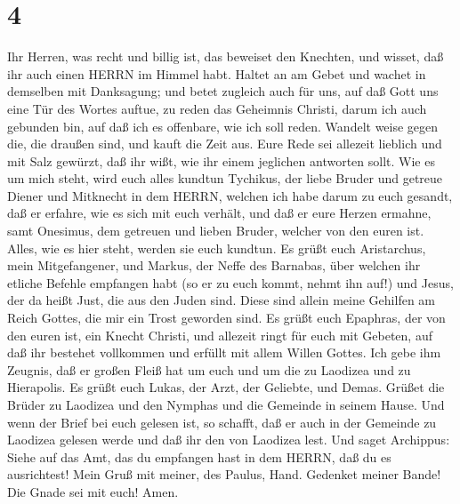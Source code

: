 \hypertarget{section-3}{%
\section{4}\label{section-3}}

 Ihr Herren, was recht und billig ist, das beweiset den
Knechten, und wisset, daß ihr auch einen HERRN im Himmel habt.
 Haltet an am Gebet und wachet in demselben mit Danksagung;
 und betet zugleich auch für uns, auf daß Gott uns eine Tür
des Wortes auftue, zu reden das Geheimnis Christi, darum ich auch
gebunden bin,  auf daß ich es offenbare, wie ich soll reden.
 Wandelt weise gegen die, die draußen sind, und kauft die
Zeit aus.  Eure Rede sei allezeit lieblich und mit Salz
gewürzt, daß ihr wißt, wie ihr einem jeglichen antworten sollt.
 Wie es um mich steht, wird euch alles kundtun Tychikus, der
liebe Bruder und getreue Diener und Mitknecht in dem HERRN, 
welchen ich habe darum zu euch gesandt, daß er erfahre, wie es sich mit
euch verhält, und daß er eure Herzen ermahne,  samt
Onesimus, dem getreuen und lieben Bruder, welcher von den euren ist.
Alles, wie es hier steht, werden sie euch kundtun.  Es
grüßt euch Aristarchus, mein Mitgefangener, und Markus, der Neffe des
Barnabas, über welchen ihr etliche Befehle empfangen habt (so er zu euch
kommt, nehmt ihn auf!)  und Jesus, der da heißt Just, die
aus den Juden sind. Diese sind allein meine Gehilfen am Reich Gottes,
die mir ein Trost geworden sind.  Es grüßt euch Epaphras,
der von den euren ist, ein Knecht Christi, und allezeit ringt für euch
mit Gebeten, auf daß ihr bestehet vollkommen und erfüllt mit allem
Willen Gottes.  Ich gebe ihm Zeugnis, daß er großen Fleiß
hat um euch und um die zu Laodizea und zu Hierapolis.  Es
grüßt euch Lukas, der Arzt, der Geliebte, und Demas. 
Grüßet die Brüder zu Laodizea und den Nymphas und die Gemeinde in seinem
Hause.  Und wenn der Brief bei euch gelesen ist, so
schafft, daß er auch in der Gemeinde zu Laodizea gelesen werde und daß
ihr den von Laodizea lest.  Und saget Archippus: Siehe auf
das Amt, das du empfangen hast in dem HERRN, daß du es ausrichtest!
 Mein Gruß mit meiner, des Paulus, Hand. Gedenket meiner
Bande! Die Gnade sei mit euch! Amen.
